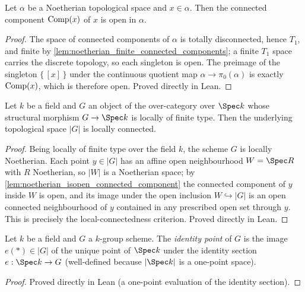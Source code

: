 \begin{lemma}\leanok
  \label{lem:noetherian_isopen_connected_component}
  Let \(\alpha\) be a Noetherian topological space and \(x \in \alpha\). Then
  the connected component \(\operatorname{Comp}(x)\) of \(x\) is open in \(\alpha\).
\end{lemma}
\begin{proof}
  The space of connected components of \(\alpha\) is totally disconnected,
  hence \(T_1\), and finite by
  \cref{lem:noetherian_finite_connected_components}; a finite \(T_1\) space
  carries the discrete topology, so each singleton is open. The preimage of
  the singleton \(\{\,[x]\,\}\) under the continuous quotient map
  \(\alpha \to \pi_0(\alpha)\) is exactly \(\operatorname{Comp}(x)\), which is
  therefore open. Proved directly in Lean.
\end{proof}

\begin{lemma}\leanok
  \label{lem:identity_component_locally_connected}
  Let \(k\) be a field and \(G\) an object of the over-category over
  \(\Spec k\) whose structural morphism \(G \to \Spec k\) is locally of
  finite type. Then the underlying topological space \(|G|\) is locally
  connected.
\end{lemma}
\begin{proof}
  Being locally of finite type over the field \(k\), the scheme \(G\) is
  locally Noetherian. Each point \(y \in |G|\) has an affine open
  neighbourhood \(W = \Spec R\) with \(R\) Noetherian, so \(|W|\) is a
  Noetherian space; by
  \cref{lem:noetherian_isopen_connected_component} the connected component
  of \(y\) inside \(W\) is open, and its image under the open inclusion
  \(W \hookrightarrow |G|\) is an open connected neighbourhood of \(y\)
  contained in any prescribed open set through \(y\). This is precisely the
  local-connectedness criterion. Proved directly in Lean.
\end{proof}

\begin{definition}\leanok
  \label{def:identity_section_point}
  Let \(k\) be a field and \(G\) a \(k\)-group scheme. The
  \emph{identity point} of \(G\) is the image \(e(\ast) \in |G|\) of the
  unique point of \(\Spec k\) under the identity section
  \(e : \Spec k \to G\) (well-defined because \(|\Spec k|\) is a
  one-point space).
\end{definition}
\begin{proof}
  Proved directly in Lean (a one-point evaluation of the identity
  section).
\end{proof}

